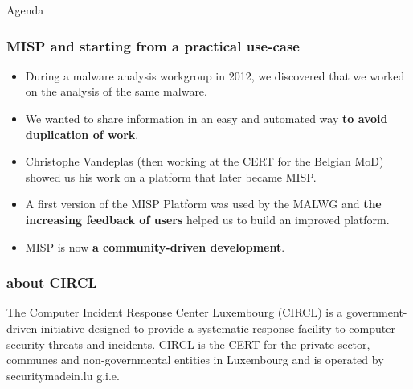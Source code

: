 
\begin{frame}[t,plain]
\titlepage
\end{frame}

\begin{frame}{Agenda}
    
\end{frame}

\begin{frame}
 \frametitle{MISP and starting from a practical use-case}
 \begin{itemize}
         \item During a malware analysis workgroup in 2012, we discovered that we worked on the analysis of the same malware.
         \item We wanted to share information in an easy and automated way {\bf to avoid duplication of work}.
         \item Christophe Vandeplas (then working at the CERT for the Belgian MoD) showed us his work on a platform that later became MISP.
         \item A first version of the MISP Platform was used by the MALWG and {\bf the increasing feedback of users} helped us to build an improved platform.
         \item MISP is now {\bf a community-driven development}.

 \end{itemize}
\end{frame}

\begin{frame}
\frametitle{about CIRCL}
The Computer Incident Response Center Luxembourg (CIRCL) is a government-driven initiative designed to provide a systematic response facility to computer security threats and incidents. CIRCL is the CERT for the private sector, communes and non-governmental entities in Luxembourg and is operated by securitymadein.lu g.i.e.
\end{frame}

